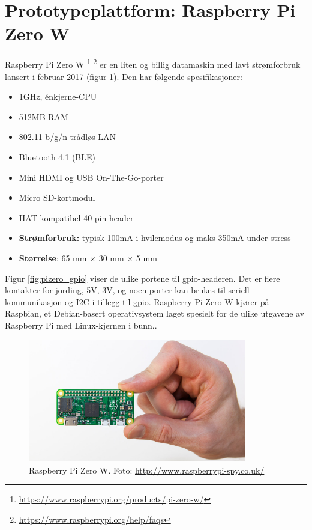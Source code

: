 \section{Prototypeplattform: Raspberry Pi Zero W}
Raspberry Pi Zero W \footnote{\url{https://www.raspberrypi.org/products/pi-zero-w/}}
\footnote{\url{https://www.raspberrypi.org/help/faqs}} er en liten og billig datamaskin med
lavt strømforbruk lansert i februar 2017 (figur \ref{fig:pizero}).
Den har følgende spesifikasjoner:
\begin{itemize}
    \item 1GHz, énkjerne-CPU
    \item 512MB RAM
    \item 802.11 b/g/n trådløs LAN
    \item Bluetooth 4.1 (BLE)
    \item Mini HDMI og USB On-The-Go-porter
    \item Micro SD-kortmodul
    \item HAT-kompatibel 40-pin header
    \item \textbf{Strømforbruk:} typisk 100mA i hvilemodus og maks 350mA under stress
    \item \textbf{Størrelse}: 65 mm × 30 mm × 5 mm
\end{itemize}

Figur \ref{fig:pizero_gpio} viser de ulike portene til \gls{gpio}-headeren. Det er flere kontakter for
jording, 5V, 3V, og noen porter kan brukes til seriell kommunikasjon og I2C i tillegg til \gls{gpio}.
Raspberry Pi Zero W kjører på Raspbian, et Debian-basert operativsystem laget spesielt for de ulike utgavene av
Raspberry Pi med Linux-kjernen i bunn..

\begin{figure}
\includegraphics[width=0.85\textwidth,center]{fig/prototype/pi_comparison}
\caption{Raspberry Pi Zero W. Foto: \url{http://www.raspberrypi-spy.co.uk/}}
\label{fig:pizero}
\end{figure}


